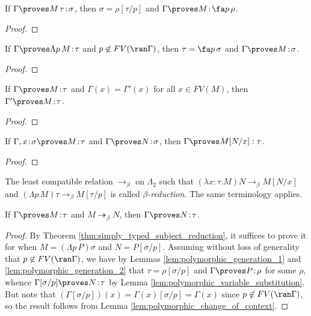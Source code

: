 \documentclass[reqno]{amsart}
\begin{document}
    \begin{lemma}\label{lem:polymorphic_generation_1}
        If $\Gamma\proves M\,\tau\!:\!\sigma$, then $\sigma=\rho[\tau/p]$ and $\Gamma\proves M\!:\!\fa p\,\rho$.
    \end{lemma}
    \begin{proof}
        \TODO
    \end{proof}

    \begin{lemma}\label{lem:polymorphic_generation_2}
        If $\Gamma\proves\Lambda p\,M\!:\!\tau$ and $p\not\in FV(\ran\Gamma)$, then $\tau=\fa p\,\sigma$ and $\Gamma\proves M\!:\!\sigma$.
    \end{lemma}
    \begin{proof}
        \TODO
    \end{proof}

    \begin{lemma}\label{lem:polymorphic_change_of_context}
        If $\Gamma\proves M\!:\!\tau$ and $\Gamma(x)=\Gamma'(x)$ for all $x\in FV(M)$, then $\Gamma'\proves M\!:\!\tau$.
    \end{lemma}
    \begin{proof}
        \TODO
    \end{proof}

    \begin{lemma}\label{lem:polymorphic_substitution}
        If $\Gamma,x\!:\!\sigma\proves M\!:\!\tau$ and $\Gamma\proves N\!:\!\sigma$, then $\Gamma\proves M[N/x]:\tau$.
    \end{lemma}
    \begin{proof}
        \TODO
    \end{proof}

    \begin{definition}
        The least compatible relation $\rightarrow_\beta$ on $\Lambda_2$ such that $(\lambda x\!:\!\tau.M)N\rightarrow_\beta M[N/x]$ and $(\Lambda p\,M)\tau\rightarrow_\beta M[\tau/p]$ is called \textit{$\beta$-reduction}. The same terminology applies.
    \end{definition}

    \begin{theorem}\label{thm:polymorphic_subject_reduction}
        If $\Gamma\proves M\!:\!\tau$ and $M\twoheadrightarrow_\beta N$, then $\Gamma\proves N\!:\!\tau$.
    \end{theorem}
    \begin{proof}
        By Theorem \ref{thm:simply_typed_subject_reduction}, it suffices to prove it for when $M=(\Lambda p\,P)\sigma$ and $N=P[\sigma/p]$. Assuming without loss of generality that $p\not\in FV(\ran\Gamma)$, we have by Lemmas \ref{lem:polymorphic_generation_1} and \ref{lem:polymorphic_generation_2} that $\tau=\rho[\sigma/p]$ and $\Gamma\proves P\!:\!\rho$ for some $\rho$, whence $\Gamma[\sigma/p]\proves N\!:\!\tau$ by Lemma \ref{lem:polymorphic_variable_substitution}. But note that $(\Gamma[\sigma/p])(x)=\Gamma(x)[\sigma/p]=\Gamma(x)$ since $p\not\in FV(\ran\Gamma)$, so the result follows from Lemma \ref{lem:polymorphic_change_of_context}. 
    \end{proof}
\end{document}
